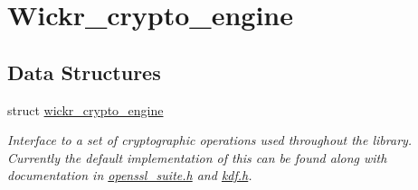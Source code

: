 \hypertarget{group__wickr__crypto__engine}{}\section{Wickr\+\_\+crypto\+\_\+engine}
\label{group__wickr__crypto__engine}
\subsection*{Data Structures}
\begin{DoxyCompactItemize}
\item 
struct \hyperlink{structwickr__crypto__engine}{wickr\+\_\+crypto\+\_\+engine}
\begin{DoxyCompactList}\small\item\em Interface to a set of cryptographic operations used throughout the library. Currently the default implementation of this can be found along with documentation in \hyperlink{openssl__suite_8h_source}{openssl\+\_\+suite.\+h} and \hyperlink{kdf_8h_source}{kdf.\+h}. \end{DoxyCompactList}\end{DoxyCompactItemize}
